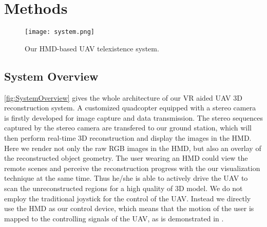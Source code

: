 \documentclass[journal]{IEEEtran}
\begin{document}
\section{Methods}

\begin{figure}[ht]
\centering %
    \texttt{[image: system.png]}
    \caption{Our HMD-based UAV telexistence system.}
    \label{fig:SystemOverview}
\end{figure}

\subsection{System Overview}
\autoref{fig:SystemOverview} gives the whole architecture of our VR aided 
UAV 3D reconstruction system.
A customized quadcopter equipped with a stereo camera is firstly developed for 
image capture and data transmission.
The stereo sequences captured by the stereo camera are transfered to our ground station, 
which will then perform real-time 3D reconstruction and display the images in the HMD. 
Here we render not only the raw RGB images in the HMD, but also an overlay of the reconstructed 
object geometry.
The user wearing an HMD could view the remote scenes and perceive the reconstruction progress 
with the our visualization technique at the same time. Thus he/she is able to actively drive  
the UAV to scan the unreconstructed regions for a high quality of 3D model.
We do not employ the traditional joystick for the control of the UAV. Instead we directly use 
the HMD as our control device, which means that the motion of the user is mapped to the controlling 
signals of the UAV, as is demonstrated in \cite{8797791}.
\end{document}
